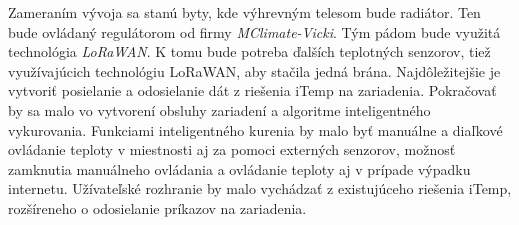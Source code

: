 Zameraním vývoja sa stanú byty, kde výhrevným telesom bude radiátor. 
Ten bude ovládaný regulátorom od firmy \emph{MClimate-Vicki}. 
Tým pádom bude využitá technológia \emph{LoRaWAN}. K tomu bude potreba ďalších teplotných senzorov, tiež využívajúcich technológiu LoRaWAN, aby stačila jedná brána. 
Najdôležitejšie je vytvoriť posielanie a odosielanie dát z riešenia iTemp na zariadenia. 
Pokračovať by sa malo vo vytvorení obsluhy zariadení a algoritme inteligentného vykurovania.
Funkciami inteligentného kurenia by malo byť manuálne a diaľkové ovládanie teploty v miestnosti aj za pomoci externých senzorov, možnosť zamknutia manuálneho ovládania a ovládanie teploty aj v prípade výpadku internetu.
Užívateľské rozhranie by malo vychádzať z existujúceho riešenia iTemp, rozšíreneho o odosielanie príkazov na zariadenia.